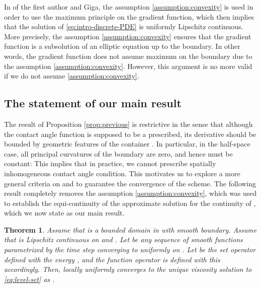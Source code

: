 \documentclass[11pt]{article}
\makeatletter
\numberwithin{equation}{section}
\newtheorem{theorem}{Theorem}[section]
\newcommand{\R}{\mathbb{R}}
\newcommand{\pOmega}[0]{\partial\Omega}
\newcounter{mathrecordid}
\newcommand{\mathboxbegin}[1]{%
  \stepcounter{mathrecordid}%
  \immediate\write\mathrecords{\themathrecordid,#1}%
  \special{pdf:bann << /Type /Annot /Subtype /Link /Border [0 0 0]
    /MathBoxID \themathrecordid /F 2
    /A << /S /URI /URI (urn:mathbox:\themathrecordid) >> >>}}
\newcommand{\mathboxinlineplain}[1]{$#1$}
\newcommand{\mathboxinline}[1]{%
  $\mathboxbegin{inline}#1\special{pdf:eann}$}
\newcommand{\recordmath}{%
  \ifmeasuring@\expandafter\mathboxinlineplain
  \else\expandafter\mathboxinline\fi}
\makeatother
\begin{document}
In \cite{EG25} of the first author and Giga, the assumption \eqref{assumption:convexity} is used in order to use the maximum principle on the gradient function, which then implies that the solution \recordmath{w} of \eqref{eq:intro-discrete-PDE} is uniformly Lipschitz continuous. More precisely, the assumption \eqref{assumption:convexity} ensures that the gradient function is a subsolution of an elliptic equation up to the boundary. In other words,  the gradient function does not assume maximum on the boundary \recordmath{\partial\Omega} due to the assumption \eqref{assumption:convexity}. However, this argument is no more valid if we do not assume \eqref{assumption:convexity}.


\subsection{The statement of our main result} The result of Proposition \ref{prop:previous} is restrictive in the sense that although the contact angle function \recordmath{\beta} is supposed to be a prescribed, its derivative
should be bounded by geometric features of the container \recordmath{\Omega}.
In particular, in the half-space case, all principal curvatures of the boundary are zero, and hence \recordmath{\beta} must be constant: This implies that in practice, we cannot prescribe spatially inhomogeneous contact angle condition. This motivates us to explore a more general criteria on \recordmath{\Omega} and \recordmath{\beta} to guarantee the convergence of the scheme. The following result completely removes the assumption \eqref{assumption:convexity}, which was used to establish the equi-continuity of the approximate solution \recordmath{w} for the continuity of \recordmath{T_h}, which we now state as our main result.

\begin{theorem}\label{thm:main}
Assume that \recordmath{\Omega} is a bounded domain in \recordmath{\R^d} with smooth boundary.
Assume that \recordmath{\beta} is Lipschitz continuous on \recordmath{\pOmega} and \recordmath{\|\beta\|_{C^0(\partial\Omega)}<1}.
Let \recordmath{\{\beta^h\}_{h>0}} be any sequence of smooth functions parametrized by the time step \recordmath{h>0} converging to \recordmath{\beta} uniformly on \recordmath{\pOmega}. Let \recordmath{T_h} be the set operator defined with the energy \recordmath{J_{\beta^h}(u)}, and the function operator \recordmath{S_h} is defined with this \recordmath{T_h} accordingly.
Then, \recordmath{u^h} locally uniformly converges to the unique viscosity solution to \eqref{eq:level-set} as \recordmath{h\to 0}.
\end{theorem}
\end{document}
